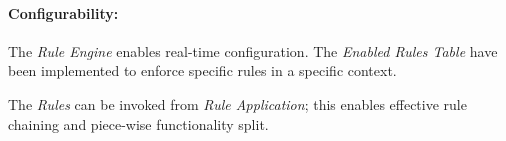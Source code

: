 \paragraph{Configurability:} The \emph{Rule Engine} enables real-time configuration. The \emph{Enabled Rules Table} have been implemented to enforce specific rules in a specific context. 

The \emph{Rules} can be invoked from \emph{Rule Application}; this enables effective rule chaining and piece-wise functionality split. 
